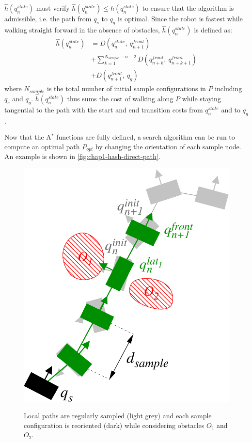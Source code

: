 $\hat{h}(q_n^{state})$ must verify $\hat{h}(q_n^{state}) \leq
h(q_n^{state})$ to ensure that the algorithm is admissible, i.e. the
path from $q_s$ to $q_g$ is optimal. Since the robot is fastest while
walking straight forward in the absence of obstacles,
$\hat{h}(q_n^{state})$ is defined as:
\begin{equation}
  \begin{split}
  \hat{h}(q_n^{state}) &= D(q_n^{state},~q_{n+1}^{front}) \\
  &+ \sum_{k=1}^{N_{sample}-n-2} D(q_{n+k}^{front},~q_{n+k+1}^{front}) \\
  &+ D(q_{n+1}^{front},~q_g)
  \end{split}
\end{equation}
where $N_{sample}$ is the total number of initial sample
configurations in $P$ including $q_s$ and
$q_g$. $\hat{h}(q_n^{state})$ thus sums the cost of walking along $P$
while staying tangential to the path with the start and
end transition costs from $q_n^{state}$ and to $q_g$.

Now that the A$^{*}$ functions are fully defined, a search algorithm can be
run to compute an optimal path $P_{opt}$ by changing the orientation
of each sample node. An example is shown in
\autoref{fig:chap1-hash-direct-path}.

\begin{figure}
  \centering
      {\includegraphics[width = 0.75\linewidth]
        {src/chap1-path-optimization/hash-direct-path.pdf}}
      \caption{Local paths are regularly sampled (light grey) and each
        sample configuration is reoriented (dark) while considering
        obstacles $O_1$ and $O_2$.}
      \label{fig:chap1-hash-direct-path}
\end{figure}

